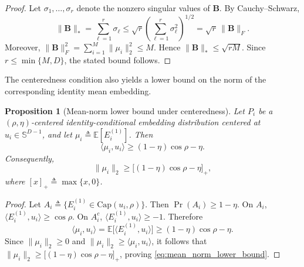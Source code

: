 \documentclass[journal]{IEEEtran}
\newtheorem{proposition}[theorem]{Proposition}
\begin{document}
\begin{bibunit}
\begin{proof}
%
Let $\sigma_1,\ldots,\sigma_r$ denote the nonzero singular values of $\mathbf{B}$. By Cauchy--Schwarz,
%
\begin{equation}
\|\mathbf{B}\|_* = \sum_{\ell=1}^r \sigma_\ell
\le \sqrt{r} \left( \sum_{\ell=1}^r \sigma_\ell^2 \right)^{1/2}
= \sqrt{r}\,\|\mathbf{B}\|_F.
\end{equation}
%
Moreover, $\|\mathbf{B}\|_F^2 = \sum_{i=1}^M \|\mu_i\|_2^2 \le M$. Hence $\|\mathbf{B}\|_* \le \sqrt{rM}$. Since $r\le \min\{M,D\}$, the stated bound follows.
%
\end{proof}



The centeredness condition also yields a lower bound on the norm of the corresponding identity mean embedding.

\begin{proposition}[Mean-norm lower bound under centeredness]
\label{prop:concentration_mean_norm}
%
Let $P_i$ be a $(\rho,\eta)$-centered identity-conditional embedding distribution centered at $u_i\in\mathbb{S}^{D-1}$, and let $\mu_i \triangleq \mathbb{E}[E_i^{(1)}]$. Then
%
\begin{equation}
\langle \mu_i,u_i\rangle \ge (1-\eta)\cos\rho - \eta.
\label{eq:mean_center_alignment}
\end{equation}
%
Consequently,
%
\begin{equation}
\|\mu_i\|_2 \ge \bigl[(1-\eta)\cos\rho - \eta\bigr]_+,
\label{eq:mean_norm_lower_bound}
\end{equation}
%
where $[x]_+\triangleq\max\{x,0\}$.
%
\end{proposition}


\begin{proof}
%
Let $A_i\triangleq \{E_i^{(1)}\in \mathrm{Cap}(u_i,\rho)\}$. Then $\Pr(A_i)\ge 1-\eta$. On $A_i$, $\langle E_i^{(1)},u_i\rangle \ge \cos\rho$. On $A_i^c$, $\langle E_i^{(1)},u_i\rangle \ge -1$. Therefore
%
\begin{equation}
\langle \mu_i,u_i\rangle = \mathbb{E}\bigl[\langle E_i^{(1)},u_i\rangle\bigr] \ge (1-\eta)\cos\rho-\eta.
\end{equation}
%
Since $\|\mu_i\|_2\ge0$ and $\|\mu_i\|_2\ge \langle \mu_i,u_i\rangle$, it follows that $\|\mu_i\|_2\ge\bigl[(1-\eta)\cos\rho-\eta\bigr]_+$, proving \eqref{eq:mean_norm_lower_bound}.
%
\end{proof}



\vspace{10pt}


\end{bibunit}
\end{document}
